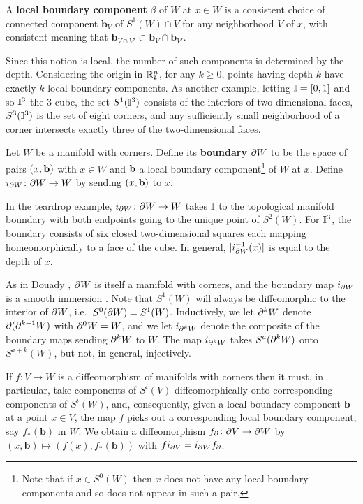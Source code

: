 \begin{definition}
	A \textbf{local boundary component} $\beta$ of $W$ at $x \in W$ is a consistent choice of connected component $\mathbf{b}_V$ of $S^1(W) \cap V$ for any neighborhood $V$ of $x$, with consistent meaning that $\mathbf{b}_{V \cap V'} \subset \mathbf{b}_{V} \cap \mathbf{b}_{V'}$.
\end{definition}

Since this notion is local, the number of such components is determined by the depth.
Considering the origin in $\mathbb{R}^n_k$, for any $k \geq 0$, points having depth $k$ have exactly $k$ local boundary components.
As another example, letting $\mathbb{I} = [0,1]$ and so $\mathbb{I}^3$ the 3-cube, the set $S^1(\mathbb{I}^3)$ consists of the interiors of two-dimensional faces, $S^3(\mathbb{I}^3)$ is the set of eight corners, and any sufficiently small neighborhood of a corner intersects exactly three of the two-dimensional faces.

\begin{definition}\label{D: MWC boundary}
	Let $W$ be a manifold with corners.
	Define its \textbf{boundary} $\partial W$ to be the space of pairs $(x, \mathbf{b})$ with $x \in W$ and $\mathbf{b}$ a local boundary component\footnote{Note that if $x \in S^0(W)$ then $x$ does not have any local boundary components and so does not appear in such a pair.} of $W$ at $x$.
	Define $i_{\partial W} \colon \partial W \to W$ by sending $(x,\mathbf{b})$ to $x$.
\end{definition}

In the teardrop example, $i_{\partial W} \colon \partial W \to W$ takes $\mathbb{I}$ to the topological manifold boundary with both endpoints going to the unique point of $S^2(W)$.
For $\mathbb{I}^3$, the boundary consists of six closed two-dimensional squares each mapping homeomorphically to a face of the cube.
In general, $|i_{\partial W}^{-1}(x)|$ is equal to the depth of $x$.

As in Douady \cite{Doua61}, $\partial W$ is itself a manifold with corners, and the boundary map $i_{\partial W}$ is a smooth immersion \cite[Theorem 3.4]{Joy12}. Note that $S^1(W)$ will always be diffeomorphic to the interior of $\partial W$, i.e.\ $S^0(\partial W) = S^1(W)$.
Inductively, we let $\partial^k W$ denote $\partial (\partial^{k-1} W)$ with $\partial^0 W = W$, and we let $i_{\partial^k W}$ denote the composite of the boundary maps sending $\partial^k W$ to $W$. The map $i_{\partial^k W}$ takes $S^a(\partial^k W)$ onto $S^{a+k}(W)$, but not, in general, injectively.

\begin{remark}\label{R: bd diff}
	If $f \colon V \to W$ is a diffeomorphism of manifolds with corners then it must, in particular, take components of $S^i(V)$ diffeomorphically onto corresponding components of $S^i(W)$, and, consequently, given a local boundary component $\mathbf{b}$ at a point $x \in V$, the map $f$ picks out a corresponding local boundary component, say $f_*(\mathbf{b})$ in $W$. We obtain a diffeomorphism $f_\partial \colon \partial V \to \partial W$ by $(x,\mathbf{b})\mapsto (f(x),f_*(\mathbf{b}))$ with $fi_{\partial V} = i_{\partial W} f_\partial$.
\end{remark}

